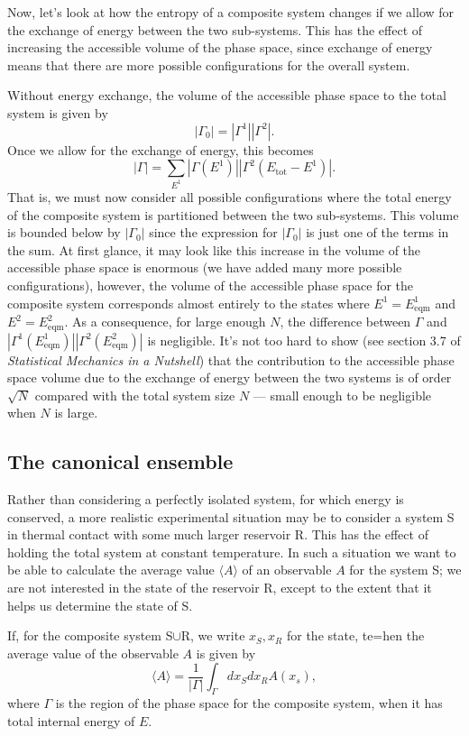 \documentclass{article}
\begin{document}
Now, let's look at how the entropy of a composite system changes if we allow for the exchange of energy between the two sub-systems. This has the effect of increasing the accessible volume of the phase space, since exchange of energy means that there are more possible configurations for the overall system.

Without energy exchange, the volume of the accessible phase space to the total system is given by
$$
	|\Gamma_0| = |\Gamma^1||\Gamma^2|.
$$
Once we allow for the exchange of energy, this becomes
$$
	|\Gamma| = \sum_{E^1}|\Gamma(E^1)||\Gamma^2(E_\text{tot}-E^1)|.
$$
That is, we must now consider all possible configurations where the total energy of the composite system is partitioned between the two sub-systems. This volume is bounded below by $|\Gamma_0|$ since the expression for $|\Gamma_0|$ is just one of the terms in the sum. At first glance, it may look like this increase in the volume of the accessible phase space is enormous (we have added many more possible configurations), however, the volume of the accessible phase space for the composite system corresponds almost entirely to the states where $E^1=E^1_\text{eqm}$ and $E^2=E^2_\text{eqm}$. As a consequence, for large enough $N$, the difference between $\Gamma$ and $|\Gamma^1(E^1_\text{eqm})||\Gamma^2(E^2_\text{eqm})|$ is negligible. It's not too hard to show (see section 3.7 of \emph{Statistical Mechanics in a Nutshell}) that the contribution to the accessible phase space volume due to the exchange of energy between the two systems is of order $\sqrt{N}$ compared with the total system size $N$ --- small enough to be negligible when $N$ is large.

\subsection*{The canonical ensemble}

Rather than considering a perfectly isolated system, for which energy is conserved, a more realistic experimental situation may be to consider a system S in thermal contact with some much larger reservoir R. This has the effect of holding the total system at constant temperature. In such a situation we want to be able to calculate the average value $\langle A\rangle$ of an observable $A$ for the system S; we are not interested in the state of the reservoir R, except to the extent that it helps us determine the state of S.

If, for the composite system S$\cup$R, we write $x_S,x_R$ for the state, te=hen the average value of the observable $A$ is given by
$$
	\langle A\rangle = \frac{1}{|\Gamma|}\int_{\Gamma}dx_Sdx_RA(x_s),
$$
where $\Gamma$ is the region of the phase space for the composite system, when it has total internal energy of $E$.
\end{document}
